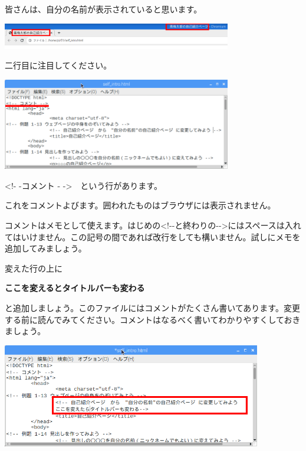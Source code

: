 \documentclass[a4paper,12pt]{jarticle}
\begin{document}
皆さんは、自分の名前が表示されていると思います。

\centering
\includegraphics[width=0.75\textwidth]{textbook-img152.png}
\flushleft


二行目に注目してください。

\centering
\includegraphics[width=0.75\textwidth]{textbook-img151.png}
\flushleft



\bigskip

{\textless}!- -コメント -
-{\textgreater}　という行があります。

これをコメントよびます。囲われたものはブラウザには表示されません。

コメントはメモとして使えます。はじめの{\textless}!-{}-と終わりの{}-{}-{\textgreater}にはスペースは入れてはいけません。この記号の間であれば改行をしても構いません。試しにメモを追加してみましょう。

変えた行の上に

\textbf{ここを変えるとタイトルバーも変わる
}

と追加しましょう。このファイルにはコメントがたくさん書いてあります。変更する前に読んでみてください。コメントはなるべく書いてわかりやすくしておきましょう。


\centering
\includegraphics[width=0.85\textwidth]{textbook-img150.png}
\end{document}
